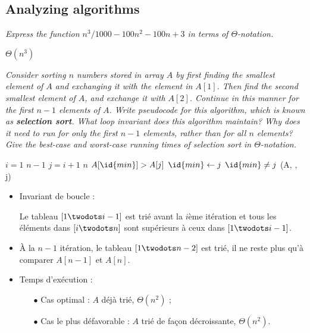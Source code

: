 \begin{description}
\begin{ex}
  \end{ex}
\subsection{Analyzing algorithms}

 {\itshape Express the function $n^3/1000-100n^2-100n+3$ in terms of $\Theta$-notation.}
  \begin{ex}
    $\Theta(n^3)$
  \end{ex}

 {\itshape
  Consider sorting $n$ numbers stored in array $A$ by first finding the smallest element of $A$ and exchanging it with the element in $A[1]$. Then find the second smallest element of $A$, and exchange it with $A[2]$. Continue in this manner for the first $n-1$ elements of $A$. Write pseudocode for this algorithm, which is known as {\bfseries selection sort}. What loop invariant does this algorithm maintain? Why does it need to run for only the first $n-1$ elements, rather than for all $n$ elements? Give the best-case and worst-case running times of selection sort in $\Theta$-notation.}

  \begin{ex}
    \begin{codebox}
       \li \For $i = 1$ \To $n-1$ \Do
       \li {}
       \li \For $j = i+1$ \To $n$ \Do
       \li \If $A[\id{min}] > A[j]$ \Then
       \li $\id{min} \gets j$ \End \End
       \li \If $\id{min} \ne j$ \Then
       \li {}(A, , j) \End \End%
    \end{codebox}

    \begin{itemize}
      \item Invariant de boucle : 

        Le tableau $[1 \twodots i-1]$ est tri\'e avant la $i$\`eme it\'eration et tous les \'el\'ements dans $[i \twodots n]$ sont sup\'erieurs \`a ceux dans $[1\twodots i-1]$.

      \item \`A la $n-1$ it\'eration, le tableau $[1\twodots n-2]$ est tri\'e, il ne reste plus qu'\`a comparer $A[n-1]$ et $A[n]$.

     \item Temps d'ex\'ecution :
        \begin{itemize}
          \item[$\bullet$] Cas optimal : $A$ d\'ej\`a tri\'e, $\Theta(n^2)$ ;
          \item[$\bullet$] Cas le plus d\'efavorable : $A$ tri\'e de fa\c{c}on d\'ecroissante, $\Theta(n^2)$.
        \end{itemize}


\end{itemize}
\end{ex}
\end{description}

